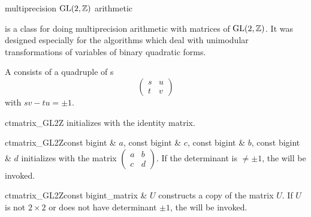 


\NAME

 \dotfill multiprecision $\mathrm{GL}(2, \mathbb{Z})$ arithmetic



\ABSTRACT

 is a class for doing multiprecision arithmetic with matrices of $\mathrm{GL}(2, \mathbb{Z}
)$.  It was designed especially for the algorithms which deal with unimodular transformations of
variables of binary quadratic forms.



\DESCRIPTION

A  consists of a quadruple of s
\begin{displaymath}
  \begin{pmatrix}
    s & u \\
    t & v
  \end{pmatrix}
\end{displaymath}
with $s v - t u = \pm 1$.



\CONS

\begin{fcode}{ct}{matrix_GL2Z}{}
  initializes with the identity matrix.
\end{fcode}

\begin{fcode}{ct}{matrix_GL2Z}{const bigint & $a$, const bigint & $c$, const bigint & $b$, const bigint & $d$}
  initializes with the matrix $\begin{pmatrix} a & b \\ c & d \end{pmatrix}$.  If the
  determinant is $\neq \pm 1$, the \LEH will be invoked.
\end{fcode}

\begin{fcode}{ct}{matrix_GL2Z}{const bigint_matrix & $U$}
  constructs a copy of the matrix $U$.  If $U$ is not $2 \times 2$ or does not have determinant $\pm
  1$, the \LEH will be invoked.
\end{fcode}

